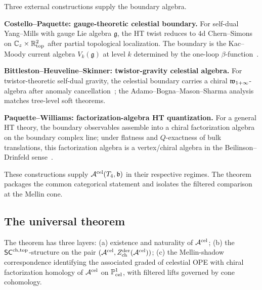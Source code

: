 Three external constructions supply the boundary algebra.

\medskip
\noindent\textbf{Costello--Paquette: gauge-theoretic celestial
boundary.} For self-dual Yang--Mills with gauge Lie algebra
$\mathfrak g$, the HT twist reduces to $4$d Chern--Simons on
$\mathbb C_z \times \mathbb R^2_{\text{top}}$ after partial topological
localization. The boundary is the Kac--Moody current algebra
$V_k(\mathfrak g)$ at level $k$ determined by the one-loop
$\beta$-function~\cite{CostelloPaquetteTwistedSugraStates}.

\medskip
\noindent\textbf{Bittleston--Heuveline--Skinner: twistor-gravity
celestial algebra.} For twistor-theoretic self-dual gravity, the
celestial boundary carries a chiral $\mathfrak w_{1+\infty}$-algebra after anomaly
cancellation~\cite{BittlestonHeuvelineSkinner}; the
Adamo--Bogna--Mason--Sharma analysis~\cite{AdamoMasonSharmaCelestial}
matches tree-level soft theorems.

\medskip
\noindent\textbf{Paquette--Williams: factorization-algebra HT
quantization.} For a general HT theory, the boundary observables
assemble into a chiral factorization algebra on the boundary complex
line; under flatness and $Q$-exactness of bulk translations, this
factorization algebra is a vertex/chiral algebra
in the Beilinson--Drinfeld sense~\cite{PaquetteWilliamsHT,
GwilliamWilliams25, WangWilliams24}.

\medskip
These constructions supply $\mathcal A^{\mathrm{cel}}(T_4,\mathfrak b)$ in
their respective regimes. The theorem packages the common categorical
statement and isolates the filtered comparison at the Mellin cone.

\subsection{The universal theorem}
\label{subsec:uch-theorem}

The theorem has three layers:
(a) existence and naturality of $\mathcal A^{\mathrm{cel}}$;
(b) the $\mathsf{SC}^{\mathrm{ch,top}}$-structure on the pair
$(\mathcal A^{\mathrm{cel}}, Z^{\mathrm{der}}_{\mathrm{ch}}(\mathcal A^{\mathrm{cel}}))$;
(c) the Mellin-shadow correspondence identifying the associated graded
of celestial OPE with chiral factorization homology of
$\mathcal A^{\mathrm{cel}}$ on $\mathbb P^1_{\text{cel}}$, with filtered lifts
governed by cone cohomology.

